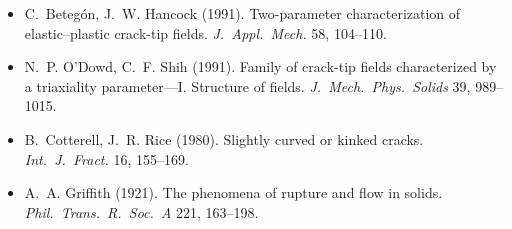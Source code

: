 \documentclass[11pt,a4paper]{article}
\begin{document}
\begin{itemize}
  \item C.~Beteg\'on, J.~W. Hancock (1991). Two-parameter characterization of elastic--plastic crack-tip fields. \emph{J.\ Appl.\ Mech.} 58, 104--110.
  \item N.~P. O'Dowd, C.~F. Shih (1991). Family of crack-tip fields characterized by a triaxiality parameter---I. Structure of fields. \emph{J.\ Mech.\ Phys.\ Solids} 39, 989--1015.
  \item B.~Cotterell, J.~R. Rice (1980). Slightly curved or kinked cracks. \emph{Int.\ J.\ Fract.} 16, 155--169.
  \item A.~A. Griffith (1921). The phenomena of rupture and flow in solids. \emph{Phil.\ Trans.\ R.\ Soc.\ A} 221, 163--198.
\end{itemize}
\end{document}
